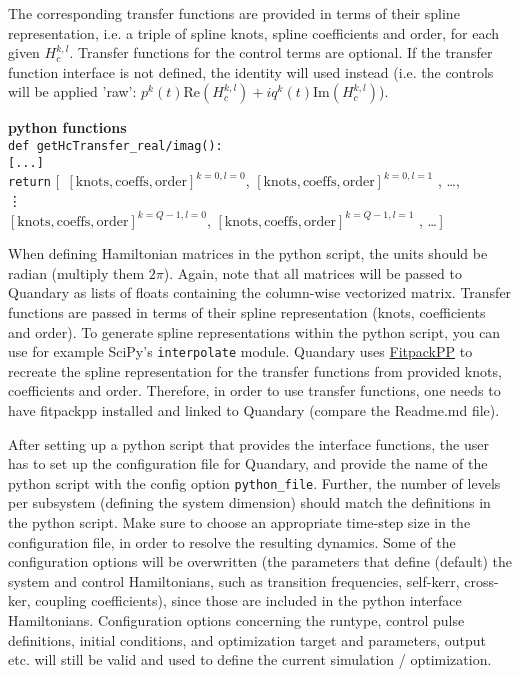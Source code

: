 \documentclass[11pt]{article}
\begin{document}
\begin{itemize}
  
  The corresponding transfer functions are provided in terms of their spline representation, i.e. a triple of spline knots, spline coefficients and order, for each given $H_c^{k,l}$. Transfer functions for the control terms are optional. If the transfer function interface is not defined, the identity will used instead (i.e. the controls will be applied 'raw': $p^k(t)\mbox{Re}(H_c^{k,l}) + iq^k(t)\mbox{Im}(H_c^{k,l})$).

  \textbf{python functions}\\
  \texttt{def getHcTransfer\_real/imag():}\\
  \indent\hspace{1cm}\texttt{[...]}  \\
  \indent\hspace{1cm}\texttt{return} [\, $\left[\text{knots}, \text{coeffs}, \text{order}\right]^{k=0,l=0}$, $\left[\text{knots}, \text{coeffs}, \text{order}\right]^{k=0, l=1}$ , \dots ,\\
  \indent\hspace{18ex}\vdots \\
  \indent\hspace{16ex} $\left[\text{knots}, \text{coeffs}, \text{order}\right]^{k=Q-1,l=0}$, $\left[\text{knots}, \text{coeffs}, \text{order}\right]^{k=Q-1, l=1}$ , \dots \,]



\end{itemize}


When defining Hamiltonian matrices in the python script, the units should be radian (multiply them $2\pi$). Again, note that all matrices will be passed to Quandary as lists of floats containing the column-wise vectorized matrix. Transfer functions are passed in terms of their spline representation (knots, coefficients and order). To generate spline representations within the python script, you can use for example SciPy's \texttt{interpolate} module. Quandary uses \href{https://github.com/jbaayen/fitpackpp}{FitpackPP} to recreate the spline representation for the transfer functions from provided knots, coefficients and order. Therefore, in order to use transfer functions, one needs to have fitpackpp installed and linked to Quandary (compare the Readme.md file). 

After setting up a python script that provides the interface functions, the user has to set up the configuration file for Quandary, and provide the name of the python script with the config option \texttt{python\_file}. Further, the number of levels per subsystem (defining the system dimension) should match the definitions in the python script. Make sure to choose an appropriate time-step size in the configuration file, in order to resolve the resulting dynamics. Some of the configuration options will be overwritten (the parameters that define (default) the system and control Hamiltonians, such as transition frequencies, self-kerr, cross-ker, coupling coefficients), since those are included in the python interface Hamiltonians. Configuration options concerning the runtype, control pulse definitions, initial conditions, and optimization target and parameters, output etc. will still be valid and used to define the current simulation / optimization. 
\end{document}
